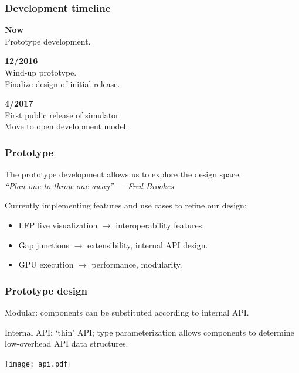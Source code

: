 \documentclass[aspectratio=43,12pt]{beamer}
\begin{document}
\begin{frame}
\frametitle{Development timeline}

\textbf{Now}\\[1ex]
\hspace{2cm}Prototype development.

\vspace{2em}
\textbf{12/2016}\\[1ex]
\hspace{2cm}Wind-up prototype.\\
\hspace{2cm}Finalize design of initial release.

\vspace{2em}
\textbf{4/2017}\\[1ex]
\hspace{2cm}First public release of simulator.\\
\hspace{2cm}Move to open development model.\\


\end{frame}
\begin{frame}
\frametitle{Prototype}

The prototype development allows us to explore the design space.
\\
\hfill\textit{``Plan one to throw one away'' --- Fred Brookes}

\vfill
Currently implementing features and use cases to refine our design:

\begin{itemize}
\item LFP live visualization $\to$ interoperability features.
\item Gap junctions $\to$ extensibility, internal API design.
\item GPU execution $\to$ performance, modularity.
\end{itemize}

\vfill
\end{frame}

\begin{frame}
\frametitle{Prototype design}
Modular: components can be substituted according to internal API.

\vspace{2ex}
Internal API: `thin' API; type parameterization allows components
to determine low-overhead API data structures.

\vspace{2ex}
\texttt{[image: api.pdf]}
\end{frame}
\end{document}
